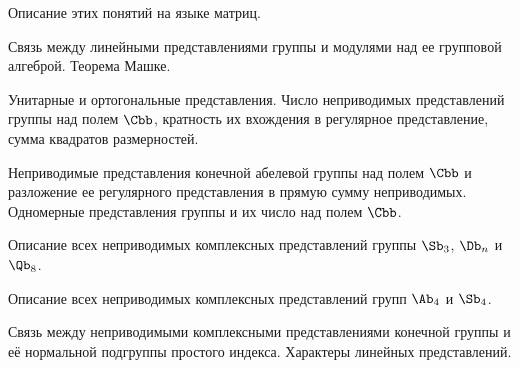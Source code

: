 \documentclass[a4paper]{article}
\begin{document}
\begin{nums}{-3.5}
Описание этих понятий на языке матриц.
\item Связь между линейными представлениями группы и модулями над ее групповой
алгеброй. Теорема Машке.
\item Унитарные и ортогональные представления. Число неприводимых представлений группы над полем $\Cbb$, кратность их
вхождения в регулярное представление, сумма квадратов размерностей.
\item Неприводимые представления конечной абелевой группы над полем $\Cbb$
и разложение ее регулярного представления в прямую сумму неприводимых. Одномерные представления группы и их число над полем $\Cbb$.
\item Описание всех неприводимых комплексных представлений группы $\Sb_3$, $\Db_n$ и $\Qb_8$.
\item Описание всех неприводимых комплексных представлений групп $\Ab_4$ и $\Sb_4$.
\item Связь между неприводимыми комплексными представлениями конечной группы и её
нормальной подгруппы простого индекса. Характеры линейных представлений.
\end{nums}

\medskip\dmvntrail
\end{document}
